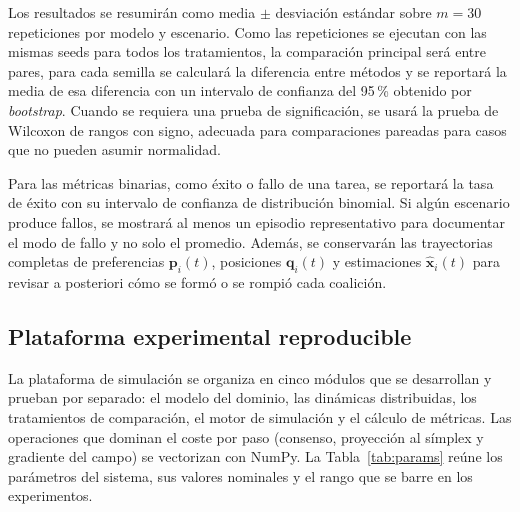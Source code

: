 Los resultados se resumirán como media $\pm$ desviación estándar sobre $m = 30$
repeticiones por modelo y escenario. Como las repeticiones se ejecutan con las
mismas seeds para todos los tratamientos, la comparación principal será entre pares,
para cada semilla se calculará la diferencia entre métodos y se reportará la media de
esa diferencia con un intervalo de confianza del 95\,\% obtenido por
\emph{bootstrap}. Cuando se requiera una prueba de significación, se usará la prueba
de Wilcoxon de rangos con signo, adecuada para comparaciones pareadas para casos que no pueden asumir
normalidad.

Para las métricas binarias, como éxito o fallo de una tarea, se reportará la tasa de
éxito con su intervalo de confianza de distribución binomial. Si algún escenario produce fallos, se
mostrará al menos un episodio representativo para documentar el modo de fallo y no
solo el promedio. Además, se conservarán las trayectorias completas de preferencias
$\mathbf{p}_i(t)$, posiciones $\mathbf{q}_i(t)$ y estimaciones
$\hat{\mathbf{x}}_i(t)$ para revisar a posteriori cómo se formó o se rompió cada
coalición.

\subsection{Plataforma experimental reproducible}

La plataforma de simulación se organiza en cinco módulos que se
desarrollan y prueban por separado: el modelo del dominio, las dinámicas distribuidas,
los tratamientos de comparación, el motor de simulación y el cálculo de métricas. Las
operaciones que dominan el coste por paso (consenso, proyección al símplex y gradiente
del campo) se vectorizan con NumPy. La Tabla~\ref{tab:params} reúne los parámetros del
sistema, sus valores nominales y el rango que se barre en los experimentos.

